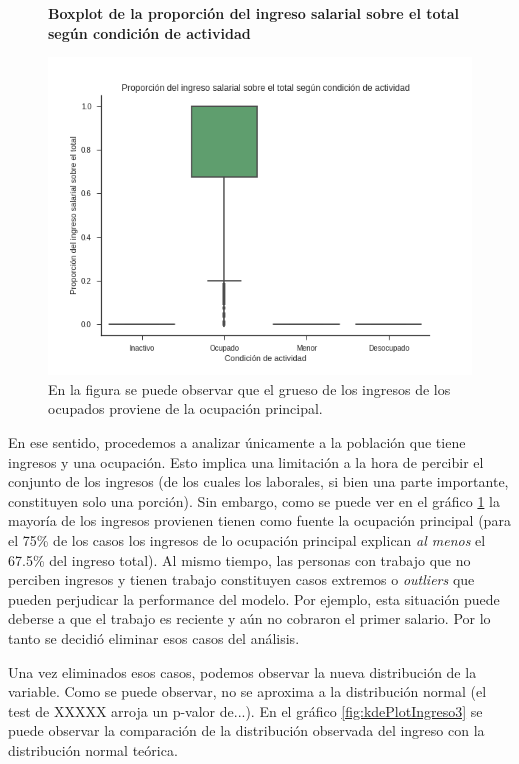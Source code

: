 \begin{figure}[!htb]
	\centering
	\textbf{Boxplot de la proporción del ingreso salarial sobre el total según condición de actividad}\par\medskip
	\includegraphics[scale = 0.5]{../img/capitulo3/ingresoSalarialVtotal.png}
	\caption{En la figura se puede observar que el grueso de los ingresos de los ocupados proviene de la ocupación principal.}
	\label{fig:ingresoSalarialVtotal}
\end{figure}

En ese sentido, procedemos a analizar únicamente a la población que tiene ingresos y una ocupación. Esto implica una limitación a la hora de percibir el conjunto de los ingresos (de los cuales los laborales, si bien una parte importante, constituyen solo una porción). Sin embargo, como se puede ver en el gráfico \ref{fig:ingresoSalarialVtotal} la mayoría de los ingresos provienen tienen como fuente la ocupación principal (para el 75\% de los casos los ingresos de lo ocupación principal explican \textit{al menos} el 67.5\% del ingreso total). Al mismo tiempo, las personas con trabajo que no perciben ingresos y tienen trabajo constituyen casos extremos o 
\textit{outliers} que pueden perjudicar la performance del modelo. Por ejemplo, esta situación puede deberse a que el trabajo es reciente y aún no cobraron el primer salario. Por lo tanto se decidió eliminar esos casos del análisis. 


Una vez eliminados esos casos, podemos observar la nueva distribución de la variable. Como se puede observar, no se aproxima a la distribución normal (el test de XXXXX arroja un p-valor de...). En el gráfico \ref{fig:kdePlotIngreso3} se puede observar la comparación de la distribución observada del ingreso con la distribución normal teórica.

